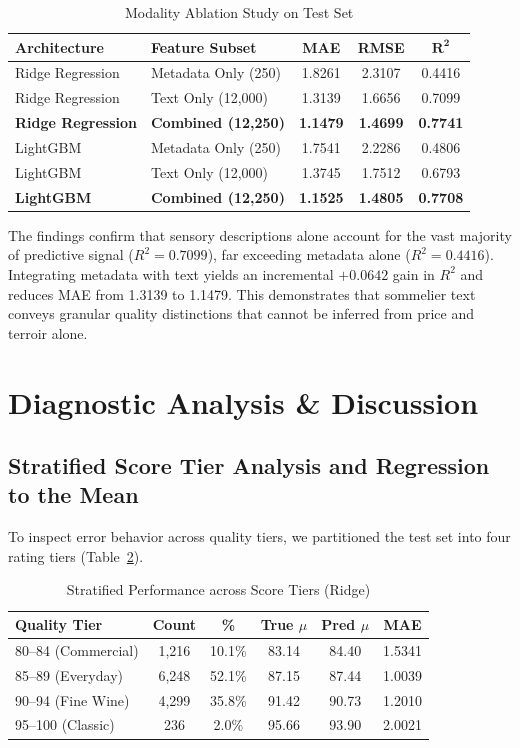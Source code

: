 \documentclass[conference]{IEEEtran}
\begin{document}
\begin{table}[htbp]
\caption{Modality Ablation Study on Test Set}
\label{tab:ablation}
\centering
\begin{tabular}{llccc}
\toprule
\textbf{Architecture} & \textbf{Feature Subset} & \textbf{MAE} & \textbf{RMSE} & $\mathbf{R^2}$ \\
\midrule
Ridge Regression & Metadata Only (250) & 1.8261 & 2.3107 & 0.4416 \\
Ridge Regression & Text Only (12,000) & 1.3139 & 1.6656 & 0.7099 \\
\textbf{Ridge Regression} & \textbf{Combined (12,250)} & \textbf{1.1479} & \textbf{1.4699} & \textbf{0.7741} \\
\midrule
LightGBM & Metadata Only (250) & 1.7541 & 2.2286 & 0.4806 \\
LightGBM & Text Only (12,000) & 1.3745 & 1.7512 & 0.6793 \\
\textbf{LightGBM} & \textbf{Combined (12,250)} & \textbf{1.1525} & \textbf{1.4805} & \textbf{0.7708} \\
\bottomrule
\end{tabular}
\end{table}

The findings confirm that sensory descriptions alone account for the vast majority of predictive signal ($R^2 = 0.7099$), far exceeding metadata alone ($R^2 = 0.4416$). Integrating metadata with text yields an incremental $+0.0642$ gain in $R^2$ and reduces MAE from 1.3139 to 1.1479. This demonstrates that sommelier text conveys granular quality distinctions that cannot be inferred from price and terroir alone.

\section{Diagnostic Analysis \& Discussion}
\subsection{Stratified Score Tier Analysis and Regression to the Mean}
To inspect error behavior across quality tiers, we partitioned the test set into four rating tiers (Table~\ref{tab:tiers}).

\begin{table}[htbp]
\caption{Stratified Performance across Score Tiers (Ridge)}
\label{tab:tiers}
\centering
\begin{tabular}{lccccc}
\toprule
\textbf{Quality Tier} & \textbf{Count} & \textbf{\%} & \textbf{True $\mu$} & \textbf{Pred $\mu$} & \textbf{MAE} \\
\midrule
80--84 (Commercial) & 1,216 & 10.1\% & 83.14 & 84.40 & 1.5341 \\
85--89 (Everyday) & 6,248 & 52.1\% & 87.15 & 87.44 & 1.0039 \\
90--94 (Fine Wine) & 4,299 & 35.8\% & 91.42 & 90.73 & 1.2010 \\
95--100 (Classic) & 236 & 2.0\% & 95.66 & 93.90 & 2.0021 \\
\bottomrule
\end{tabular}
\end{table}
\end{document}
